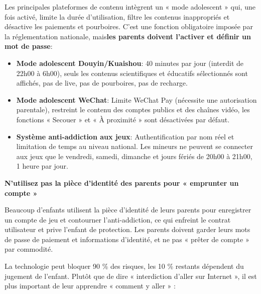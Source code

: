 
Les principales plateformes de contenu intègrent un « mode adolescent » qui, une fois activé, limite la durée d'utilisation, filtre les contenus inappropriés et désactive les paiements et pourboires. C'est une fonction obligatoire imposée par la réglementation nationale, mais\textbf{les parents doivent l'activer et définir un mot de passe}:

\begin{itemize}
  \item \textbf{Mode adolescent Douyin/Kuaishou}: 40 minutes par jour (interdit de 22h00 à 6h00), seuls les contenus scientifiques et éducatifs sélectionnés sont affichés, pas de live, pas de pourboires, pas de recharge.
  \item \textbf{Mode adolescent WeChat}: Limite WeChat Pay (nécessite une autorisation parentale), restreint le contenu des comptes publics et des chaînes vidéo, les fonctions « Secouer » et « À proximité » sont désactivées par défaut.
  \item \textbf{Système anti-addiction aux jeux}: Authentification par nom réel et limitation de temps au niveau national. Les mineurs ne peuvent se connecter aux jeux que le vendredi, samedi, dimanche et jours fériés de 20h00 à 21h00, 1 heure par jour.
\end{itemize}

\textbf{N'utilisez pas la pièce d'identité des parents pour « emprunter un compte »}\par

Beaucoup d'enfants utilisent la pièce d'identité de leurs parents pour enregistrer un compte de jeu et contourner l'anti-addiction, ce qui enfreint le contrat utilisateur et prive l'enfant de protection. Les parents doivent garder leurs mots de passe de paiement et informations d'identité, et ne pas « prêter de compte » par commodité.


La technologie peut bloquer 90 \% des risques, les 10 \% restants dépendent du jugement de l'enfant. Plutôt que de dire « interdiction d'aller sur Internet », il est plus important de leur apprendre « comment y aller » :

